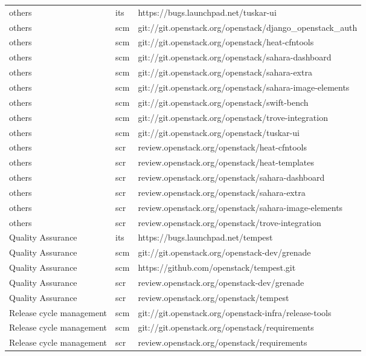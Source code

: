 \documentclass[a4wide,11pt]{report}
\begin{document}
\begin{center}
\begin{longtable}{|p{4cm}|p{1cm}|p{10cm}|}
others&its&https://bugs.launchpad.net/tuskar-ui\\ 
others&scm&git://git.openstack.org/openstack/django\_openstack\_auth\\ 
others&scm&git://git.openstack.org/openstack/heat-cfntools\\ 
others&scm&git://git.openstack.org/openstack/sahara-dashboard\\ 
others&scm&git://git.openstack.org/openstack/sahara-extra\\ 
others&scm&git://git.openstack.org/openstack/sahara-image-elements\\ 
others&scm&git://git.openstack.org/openstack/swift-bench\\ 
others&scm&git://git.openstack.org/openstack/trove-integration\\ 
others&scm&git://git.openstack.org/openstack/tuskar-ui\\ 
others&scr&review.openstack.org/openstack/heat-cfntools\\ 
others&scr&review.openstack.org/openstack/heat-templates\\ 
others&scr&review.openstack.org/openstack/sahara-dashboard\\ 
others&scr&review.openstack.org/openstack/sahara-extra\\ 
others&scr&review.openstack.org/openstack/sahara-image-elements\\ 
others&scr&review.openstack.org/openstack/trove-integration\\ 
Quality Assurance&its&https://bugs.launchpad.net/tempest\\ 
Quality Assurance&scm&git://git.openstack.org/openstack-dev/grenade\\ 
Quality Assurance&scm&https://github.com/openstack/tempest.git\\ 
Quality Assurance&scr&review.openstack.org/openstack-dev/grenade\\ 
Quality Assurance&scr&review.openstack.org/openstack/tempest\\ 
Release cycle management&scm&git://git.openstack.org/openstack-infra/release-tools\\ 
Release cycle management&scm&git://git.openstack.org/openstack/requirements\\ 
Release cycle management&scr&review.openstack.org/openstack/requirements\\
\hline
\end{longtable}
\end{center}
\end{document}
